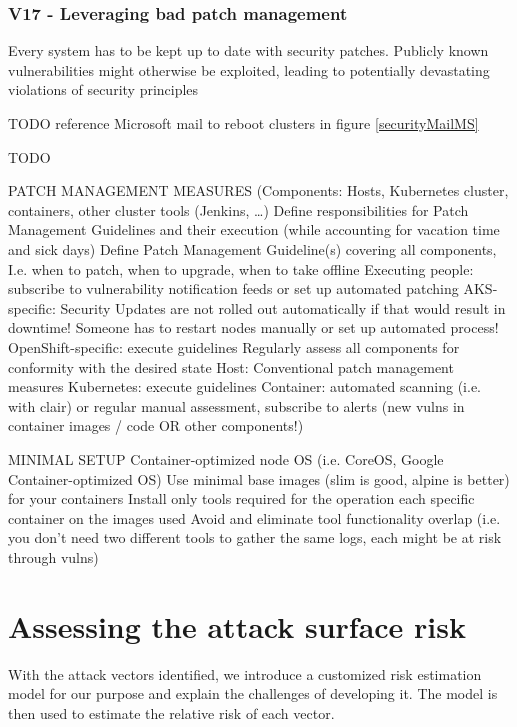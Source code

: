 \subsection{V17 - Leveraging bad patch management}
Every system has to be kept up to date with  security patches. Publicly known vulnerabilities might otherwise be exploited, leading to potentially devastating violations of security principles

TODO reference Microsoft mail to reboot clusters in figure \ref{securityMailMS}

TODO

PATCH MANAGEMENT MEASURES
(Components: Hosts, Kubernetes cluster, containers, other cluster tools (Jenkins, …)
	Define responsibilities for Patch Management Guidelines and their execution (while accounting for vacation time and sick days)
	Define Patch Management Guideline(s) covering all components, I.e. when to patch, when to upgrade, when to take offline
	Executing people: subscribe to vulnerability notification feeds or set up automated patching
	AKS-specific: Security Updates are not rolled out automatically if that would result in downtime! Someone has to restart nodes manually or set up automated process!
	OpenShift-specific: execute guidelines
	Regularly assess all components for conformity with the desired state
	Host: Conventional patch management measures
	Kubernetes: execute guidelines
	Container: automated scanning (i.e. with clair) or regular manual assessment, subscribe to alerts (new vulns in container images / code OR other components!)
	
MINIMAL SETUP	
	Container-optimized node OS (i.e. CoreOS, Google Container-optimized OS)
	Use minimal base images (slim is good, alpine is better) for your containers
	Install only tools required for the operation each specific container on the images used
	Avoid and eliminate tool functionality overlap (i.e. you don't need two different tools to gather the same logs, each might be at risk through vulns)


\chapter{Assessing the attack surface risk}

With the attack vectors identified, we introduce a customized risk estimation model for our purpose and explain the challenges of developing it. The model is then used to estimate the relative risk of each vector.

